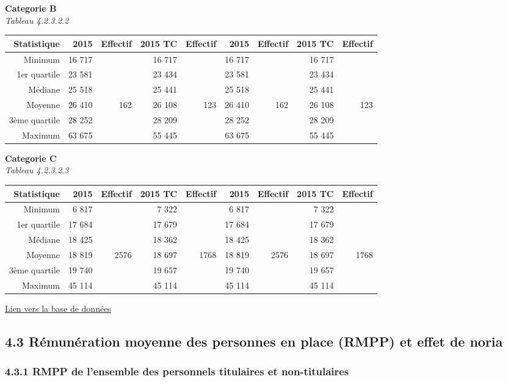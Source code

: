 \textbf{Categorie B}\\
\hspace*{0.333em}\emph{Tableau 4.2.3.2.2}

\begin{longtable}[]{@{}rrrrrrrrr@{}}
\toprule
Statistique & 2015 & Effectif & 2015 TC & Effectif & 2015 & Effectif &
2015 TC & Effectif\tabularnewline
\midrule
\endhead
Minimum & 16 717 & & 16 717 & & 16 717 & & 16 717 &\tabularnewline
1er quartile & 23 581 & & 23 434 & & 23 581 & & 23 434 &\tabularnewline
Médiane & 25 518 & & 25 441 & & 25 518 & & 25 441 &\tabularnewline
Moyenne & 26 410 & 162 & 26 108 & 123 & 26 410 & 162 & 26 108 &
123\tabularnewline
3ème quartile & 28 252 & & 28 209 & & 28 252 & & 28 209 &\tabularnewline
Maximum & 63 675 & & 55 445 & & 63 675 & & 55 445 &\tabularnewline
\bottomrule
\end{longtable}

\textbf{Categorie C}\\
\hspace*{0.333em}\emph{Tableau 4.2.3.2.3}

\begin{longtable}[]{@{}rrrrrrrrr@{}}
\toprule
Statistique & 2015 & Effectif & 2015 TC & Effectif & 2015 & Effectif &
2015 TC & Effectif\tabularnewline
\midrule
\endhead
Minimum & 6 817 & & 7 322 & & 6 817 & & 7 322 &\tabularnewline
1er quartile & 17 684 & & 17 679 & & 17 684 & & 17 679 &\tabularnewline
Médiane & 18 425 & & 18 362 & & 18 425 & & 18 362 &\tabularnewline
Moyenne & 18 819 & 2576 & 18 697 & 1768 & 18 819 & 2576 & 18 697 &
1768\tabularnewline
3ème quartile & 19 740 & & 19 657 & & 19 740 & & 19 657 &\tabularnewline
Maximum & 45 114 & & 45 114 & & 45 114 & & 45 114 &\tabularnewline
\bottomrule
\end{longtable}

\href{../Bases/Remunerations/Analyse.variations.par.exercice.csv}{Lien vers
la base de données}

\hypertarget{remuneration-moyenne-des-personnes-en-place-rmpp-et-effet-de-noria}{%
\subsection{4.3 Rémunération moyenne des personnes en place (RMPP) et
effet de
noria}\label{remuneration-moyenne-des-personnes-en-place-rmpp-et-effet-de-noria}}

\hypertarget{rmpp-de-lensemble-des-personnels-titulaires-et-non-titulaires}{%
\subsubsection{4.3.1 RMPP de l'ensemble des personnels titulaires et
non-titulaires}\label{rmpp-de-lensemble-des-personnels-titulaires-et-non-titulaires}}

